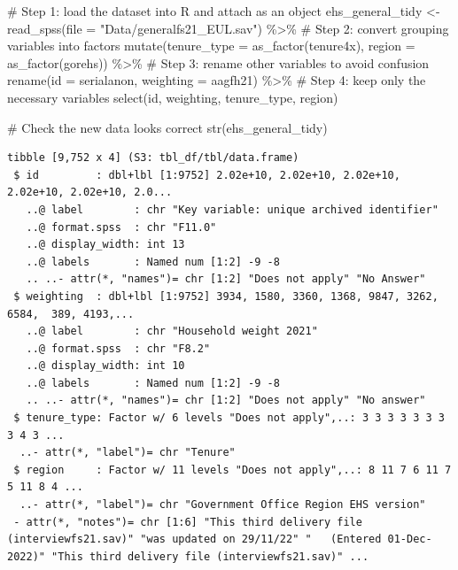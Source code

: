 \documentclass[
  letterpaper,
  DIV=11,
  numbers=noendperiod]{scrreprt}
\newenvironment{Shaded}{\begin{snugshade}}{\end{snugshade}}
\newcommand{\AttributeTok}[1]{\textcolor[rgb]{0.40,0.45,0.13}{#1}}
\newcommand{\CommentTok}[1]{\textcolor[rgb]{0.37,0.37,0.37}{#1}}
\newcommand{\FunctionTok}[1]{\textcolor[rgb]{0.28,0.35,0.67}{#1}}
\newcommand{\NormalTok}[1]{\textcolor[rgb]{0.00,0.23,0.31}{#1}}
\newcommand{\OtherTok}[1]{\textcolor[rgb]{0.00,0.23,0.31}{#1}}
\newcommand{\SpecialCharTok}[1]{\textcolor[rgb]{0.37,0.37,0.37}{#1}}
\newcommand{\StringTok}[1]{\textcolor[rgb]{0.13,0.47,0.30}{#1}}
\begin{document}
\begin{Shaded}
\begin{Highlighting}[]
\CommentTok{\# Step 1: load the dataset into R and attach as an object}
\NormalTok{ehs\_general\_tidy }\OtherTok{\textless{}{-}} \FunctionTok{read\_spss}\NormalTok{(}\AttributeTok{file =} \StringTok{"Data/generalfs21\_EUL.sav"}\NormalTok{) }\SpecialCharTok{\%\textgreater{}\%} 
\CommentTok{\# Step 2: convert grouping variables into factors}
                    \FunctionTok{mutate}\NormalTok{(}\AttributeTok{tenure\_type =} \FunctionTok{as\_factor}\NormalTok{(tenure4x),}
                           \AttributeTok{region =} \FunctionTok{as\_factor}\NormalTok{(gorehs)) }\SpecialCharTok{\%\textgreater{}\%} 
\CommentTok{\# Step 3: rename other variables to avoid confusion}
                    \FunctionTok{rename}\NormalTok{(}\AttributeTok{id =}\NormalTok{ serialanon,}
                           \AttributeTok{weighting =}\NormalTok{ aagfh21) }\SpecialCharTok{\%\textgreater{}\%} 
\CommentTok{\# Step 4: keep only the necessary variables}
                    \FunctionTok{select}\NormalTok{(id, weighting, tenure\_type, region)}

\CommentTok{\# Check the new data looks correct}
\FunctionTok{str}\NormalTok{(ehs\_general\_tidy)}
\end{Highlighting}
\end{Shaded}

\begin{verbatim}
tibble [9,752 x 4] (S3: tbl_df/tbl/data.frame)
 $ id         : dbl+lbl [1:9752] 2.02e+10, 2.02e+10, 2.02e+10, 2.02e+10, 2.02e+10, 2.0...
   ..@ label        : chr "Key variable: unique archived identifier"
   ..@ format.spss  : chr "F11.0"
   ..@ display_width: int 13
   ..@ labels       : Named num [1:2] -9 -8
   .. ..- attr(*, "names")= chr [1:2] "Does not apply" "No Answer"
 $ weighting  : dbl+lbl [1:9752] 3934, 1580, 3360, 1368, 9847, 3262, 6584,  389, 4193,...
   ..@ label        : chr "Household weight 2021"
   ..@ format.spss  : chr "F8.2"
   ..@ display_width: int 10
   ..@ labels       : Named num [1:2] -9 -8
   .. ..- attr(*, "names")= chr [1:2] "Does not apply" "No answer"
 $ tenure_type: Factor w/ 6 levels "Does not apply",..: 3 3 3 3 3 3 3 3 4 3 ...
  ..- attr(*, "label")= chr "Tenure"
 $ region     : Factor w/ 11 levels "Does not apply",..: 8 11 7 6 11 7 5 11 8 4 ...
  ..- attr(*, "label")= chr "Government Office Region EHS version"
 - attr(*, "notes")= chr [1:6] "This third delivery file (interviewfs21.sav)" "was updated on 29/11/22" "   (Entered 01-Dec-2022)" "This third delivery file (interviewfs21.sav)" ...
\end{verbatim}
\end{document}
